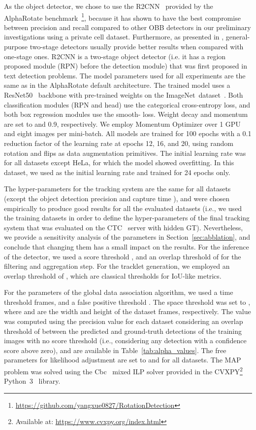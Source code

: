 \documentclass{article}
\begin{document}
As the object detector, we chose to use the R2CNN~\cite{r2cnn} provided by the AlphaRotate benchmark~\footnote{\url{https://github.com/yangxue0827/RotationDetection}}, because it has shown to have the best compromise between precision and recall compared to other OBB detectors in our preliminary investigations using a private cell dataset. Furthermore, as presented in \cite{liu2020deep}, general-purpose two-stage detectors usually provide better results when compared with one-stage ones. R2CNN is a two-stage object detector (i.e. it has a region proposed module (RPN) before the detection module) that was first proposed in text detection problems. The model parameters used for all experiments are the same as in the AlphaRotate default architecture. The trained model uses a ResNet50~\cite{resnet} backbone with pre-trained weights on the ImageNet~dataset~\cite{imagenet}. Both classification modules (RPN and head) use the categorical cross-entropy loss, and both box regression modules use the smooth- loss. Weight decay and momentum are set to  and 0.9, respectively. We employ Momentum Optimizer over 1 GPU and eight images per mini-batch. All models are trained for 100 epochs with a 0.1 reduction factor of the learning rate at epochs 12, 16, and 20, using random rotation and flips as data augmentation primitives. The initial learning rate was  for all datasets except HeLa, for which the model showed overfitting. In this dataset, we used  as the initial learning rate and trained for 24 epochs only.

The hyper-parameters for the tracking system are the same for all datasets (except the object detection precision   and capture time ), and were chosen empirically to produce good results for all the evaluated datasets (i.e., we used the training datasets in order to define the hyper-parameters of the final tracking system that was evaluated on the CTC~\cite{isbi} server with hidden GT). Nevertheless, we provide a sensitivity analysis of the parameters in Section~\ref{sec:abblation}, and conclude that changing them has a small impact on the results. For the inference of the detector, we used a score threshold , and an overlap threshold of  for the filtering and aggregation step. For the tracklet generation, we employed an overlap threshold of , which are classical thresholds for IoU-like metrics.

For the parameters of the global data association algorithm, we used a time threshold  frames, and a false positive threshold . The space threshold was set to , where  and  are the width and height of the dataset frames, respectively. The  value was computed using the precision value for each dataset considering an overlap threshold of  between the predicted and ground-truth detections of the training images with no score threshold (i.e., considering any detection with a confidence score above zero), and are available in Table~\ref{tab:alpha_values}. The free parameters for likelihood adjustment are set to  and  for all datasets. The MAP problem was solved using the Cbc~\cite{cbc} mixed ILP solver provided in the CVXPY\footnote{Available at: \url{https://www.cvxpy.org/index.html}} Python~3~\cite{python} library.
\end{document}
